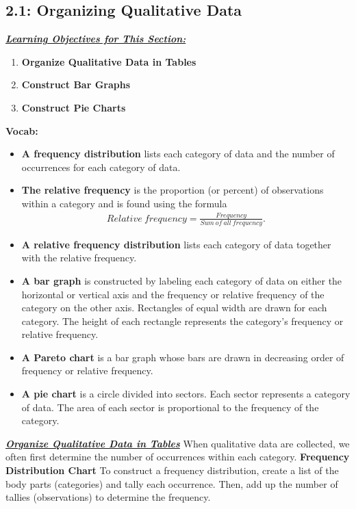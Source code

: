 \documentclass{report}
\begin{document}
        \subsection{2.1: Organizing Qualitative Data}
        \bigbreak \noindent 
        \textbf{\textit{\underline{Learning Objectives for This Section:}}}
        \begin{enumerate}
            \item \textbf{Organize Qualitative Data in Tables}
            \item \textbf{Construct Bar Graphs}
            \item \textbf{Construct Pie Charts}
        \end{enumerate}
        \bigbreak \noindent 
        \textbf{Vocab:}
        \begin{itemize}
            \item \textbf{A frequency distribution} lists each category of data and the number of occurrences for each category of data.
            \item \textbf{The relative frequency} is the proportion (or percent) of observations within a category and is found using the formula
                \begin{align*}
                    Relative\ frequency = \frac{Frequency}{Sum\ of\ all\ frequency}
                .\end{align*}
            \item \textbf{A relative frequency distribution} lists each category of data together with the relative frequency.
            \item \textbf{A bar graph} is constructed by labeling each category of data on either the horizontal or vertical axis and the frequency or relative frequency of the category on the other axis. Rectangles of equal width are drawn for each category. The height of each rectangle represents the category's frequency or relative frequency.
            \item \textbf{A Pareto chart} is a bar graph whose bars are drawn in decreasing order of frequency or relative frequency.
            \item \textbf{A pie chart} is a circle divided into sectors. Each sector represents a category of data. The area of each sector is proportional to the frequency of the category.
        \end{itemize}

        \pagebreak \bigbreak \noindent
        \textbf{\textit{\underline{Organize Qualitative Data in Tables}}}
        \bigbreak \noindent 
        When qualitative data are collected, we often first determine the number of occurrences within each category.
        \bigbreak \noindent 
        \textbf{Frequency Distribution Chart}
        \bigbreak \noindent 
        To construct a frequency distribution, create a list of the body parts (categories) and tally each occurrence. Then, add up the number of tallies (observations) to determine the frequency.
        \bigbreak \noindent 
        \bigbreak \noindent 
\end{document}
